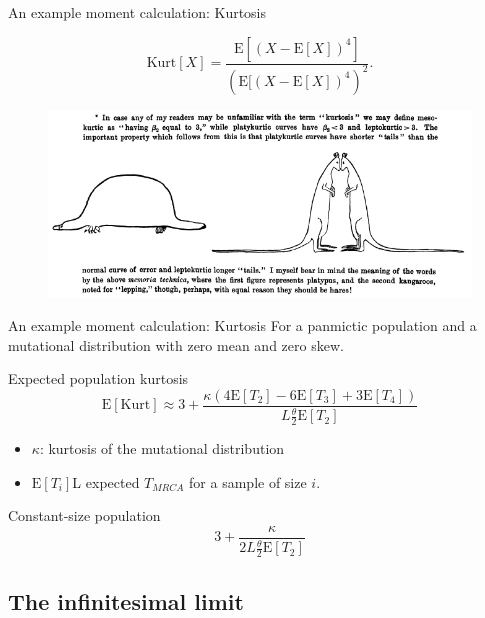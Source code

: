 \documentclass{beamer}
\newcommand{\T}{\frac{\theta}{2}}
\newcommand{\E}{\mathrm{E}}
\begin{document}
\begin{frame}{An example moment calculation: Kurtosis}
  \begin{definition}[Kurtosis]
    \begin{equation*}
      \mbox{Kurt}[X]=\frac{\E[(X-\E[X])^4]}{(\E[(X-\E[X])^4)^2}.
    \end{equation*}
  \end{definition}
  \begin{figure}
    \includegraphics[width=\textwidth]{kurtosis-Student1927.png}        
  \end{figure}
\end{frame}

\begin{frame}{An example moment calculation: Kurtosis}
  For a panmictic population and a mutational distribution with zero mean and
  zero skew.
  \begin{block}{Expected population kurtosis}
    \begin{equation*}
      \E[\mbox{Kurt}] \approx 3 + \frac{\kappa( 4\E[T_2] - 6\E[T_3] + 
        3\E[T_4])}{L \T \E[T_2]}
    \end{equation*}
  \end{block}
  \begin{itemize}
  \item $\kappa$: kurtosis of the mutational distribution
  \item $\E[T_i]$L expected $T_{MRCA}$ for a sample of size $i$. 
  \end{itemize}
  \begin{block}{Constant-size population}
    \begin{equation*}
      3 + \frac{\kappa}{2L\T \E[T_2]}
    \end{equation*}
  \end{block}
\end{frame}

\subsection{The infinitesimal limit}
\end{document}
